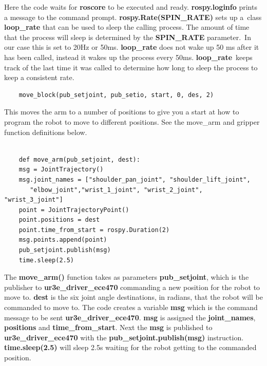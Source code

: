 Here the code waits for \textbf{roscore} to be executed and ready.  \textbf{rospy.loginfo} prints a message to the command prompt.  \textbf{rospy.Rate(SPIN\_RATE)} sets up a\
class \textbf{loop\_rate} that can be used to sleep the calling process.  The amount of time that the process will sleep is determined by the \textbf{SPIN\_RATE} parameter.\
In our case this is set to 20Hz or 50ms.  \textbf{loop\_rate} does not wake up 50 ms after it has been called, instead it wakes up the process every 50ms.  \textbf{loop\_rate}\
keeps track of the last time it was called to determine how long to sleep the process to keep a consistent rate.    
   
{\footnotesize
\begin{verbatim}
    move_block(pub_setjoint, pub_setio, start, 0, des, 2)

\end{verbatim}}

This moves the arm to a number of positions to give you a start at how to program the robot to move to different positions.  See the move\_arm
and gripper function definitions below.

{\footnotesize
\begin{verbatim}

    def move_arm(pub_setjoint, dest):
    msg = JointTrajectory()
    msg.joint_names = ["shoulder_pan_joint", "shoulder_lift_joint", 
       "elbow_joint","wrist_1_joint", "wrist_2_joint", "wrist_3_joint"]
    point = JointTrajectoryPoint()
    point.positions = dest
    point.time_from_start = rospy.Duration(2)
    msg.points.append(point)
    pub_setjoint.publish(msg)
    time.sleep(2.5)    

\end{verbatim}}

The \textbf{move\_arm()} function takes as parameters \textbf{pub\_setjoint}, which is the publisher to \textbf{ur3e\_driver\_ece470} commanding a new position for the robot to move
to. \textbf{dest} is the six joint angle destinations, in radians, that the robot will be commanded to move to.  
The code creates a variable \textbf{msg} which is the command message to be sent \textbf{ur3e\_driver\_ece470}.  \textbf{msg} is assigned the \textbf{joint\_names}, \textbf{positions} and \textbf{time\_from\_start}.
Next the \textbf{msg} is published to \textbf{ur3e\_driver\_ece470} with the \textbf{pub\_setjoint.publish(msg)} instruction.
\textbf{time.sleep(2.5)} will sleep 2.5s waiting for the robot getting to the commanded position.


